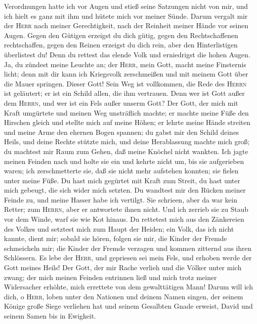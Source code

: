 Verordnungen hatte ich vor Augen und stieß seine Satzungen nicht von
mir,  und ich hielt es ganz mit ihm und hütete mich vor
meiner Sünde.  Darum vergalt mir der \textsc{Herr} nach
meiner Gerechtigkeit, nach der Reinheit meiner Hände vor seinen Augen.
 Gegen den Gütigen erzeigst du dich gütig, gegen den
Rechtschaffenen rechtschaffen,  gegen den Reinen erzeigst
du dich rein, aber den Hinterlistigen überlistest du! 
Denn du rettest das elende Volk und erniedrigst die hohen Augen.
 Ja, du zündest meine Leuchte an; der \textsc{Herr}, mein
Gott, macht meine Finsternis licht;  denn mit dir kann
ich Kriegsvolk zerschmeißen und mit meinem Gott über die Mauer springen.
 Dieser Gott! Sein Weg ist vollkommen, die Rede des
\textsc{Herrn} ist geläutert; er ist ein Schild allen, die ihm
vertrauen.  Denn wer ist Gott außer dem \textsc{Herrn},
und wer ist ein Fels außer unserm Gott?  Der Gott, der
mich mit Kraft umgürtete und meinen Weg unsträflich machte;
 er machte meine Füße den Hirschen gleich und stellte
mich auf meine Höhen;  er lehrte meine Hände streiten und
meine Arme den ehernen Bogen spannen;  du gabst mir den
Schild deines Heils, und deine Rechte stützte mich, und deine
Herablassung machte mich groß;  du machtest mir Raum zum
Gehen, daß meine Knöchel nicht wankten.  Ich jagte meinen
Feinden nach und holte sie ein und kehrte nicht um, bis sie aufgerieben
waren;  ich zerschmetterte sie, daß sie nicht mehr
aufstehen konnten; sie fielen unter meine Füße.  Du hast
mich gegürtet mit Kraft zum Streit, du hast unter mich gebeugt, die sich
wider mich setzten.  Du wandtest mir den Rücken meiner
Feinde zu, und meine Hasser habe ich vertilgt.  Sie
schrieen, aber da war kein Retter; zum \textsc{Herrn}, aber er
antwortete ihnen nicht.  Und ich zerrieb sie zu Staub vor
dem Winde, warf sie wie Kot hinaus.  Du rettetest mich
aus den Zänkereien des Volkes und setztest mich zum Haupt der Heiden;
ein Volk, das ich nicht kannte, dient mir;  sobald sie
hören, folgen sie mir, die Kinder der Fremde schmeicheln mir;
 die Kinder der Fremde verzagen und kommen zitternd aus
ihren Schlössern.  Es lebe der \textsc{Herr}, und
gepriesen sei mein Fels, und erhoben werde der Gott meines Heils!
 Der Gott, der mir Rache verlieh und die Völker unter
mich zwang;  der mich meinen Feinden entrinnen ließ und
mich trotz meiner Widersacher erhöhte, mich errettete von dem
gewalttätigen Mann!  Darum will ich dich, o
\textsc{Herr}, loben unter den Nationen und deinem Namen singen,
 der seinem Könige große Siege verliehen hat und seinem
Gesalbten Gnade erweist, David und seinem Samen bis in Ewigkeit.

